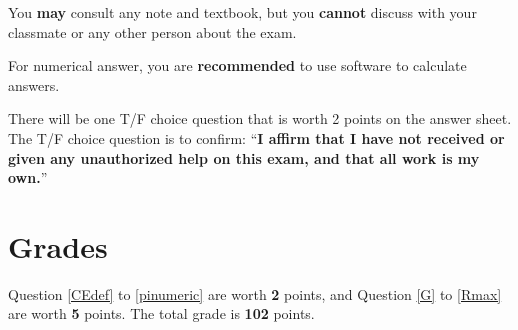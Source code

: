\documentclass[14pt]{extarticle}
\begin{document}
You \textbf{may} consult any note and textbook, but you \textbf{cannot} discuss with your classmate or any other person about the exam.

For numerical answer, you are \textbf{recommended} to use software to calculate answers.

There will be one T/F choice question that is worth 2 points on the answer sheet. The T/F choice question is to confirm: ``\textbf{I affirm that I have not received or given any unauthorized help on this exam, and that all work is my own.}''

\section*{Grades}
\label{sec:Grades}

Question \ref{CEdef} to \ref{pinumeric} are worth \textbf{2} points, and Question \ref{G} to \ref{Rmax} are worth \textbf{5} points.
The total grade is \textbf{102} points.


\newpage
\end{document}
